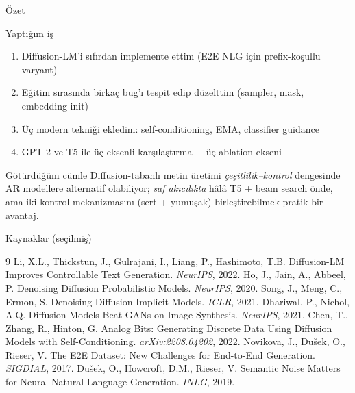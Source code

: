 \documentclass[10pt,aspectratio=169]{beamer}
\begin{document}
\begin{frame}{Özet}
  \begin{block}{Yaptığım iş}
    \begin{enumerate}
      \item Diffusion-LM'i sıfırdan implemente ettim (E2E NLG için
            prefix-koşullu varyant)
      \item Eğitim sırasında birkaç bug'ı tespit edip düzelttim
            (sampler, mask, embedding init)
      \item Üç modern tekniği ekledim: self-conditioning, EMA,
            classifier guidance
      \item GPT-2 ve T5 ile üç eksenli karşılaştırma + üç ablation ekseni
    \end{enumerate}
  \end{block}

  \begin{exampleblock}{Götürdüğüm cümle}
    Diffusion-tabanlı metin üretimi \emph{çeşitlilik--kontrol} dengesinde
    AR modellere alternatif olabiliyor; \emph{saf akıcılıkta} hâlâ
    T5 + beam search önde, ama iki kontrol mekanizmasını
    (sert + yumuşak) birleştirebilmek pratik bir avantaj.
  \end{exampleblock}
\end{frame}

\begin{frame}{Kaynaklar (seçilmiş)}
  \footnotesize
  \begin{thebibliography}{9}
     Li, X.L., Thickstun, J., Gulrajani, I., Liang, P., Hashimoto, T.B.
      \newblock Diffusion-LM Improves Controllable Text Generation. \emph{NeurIPS}, 2022.
     Ho, J., Jain, A., Abbeel, P.
      \newblock Denoising Diffusion Probabilistic Models. \emph{NeurIPS}, 2020.
     Song, J., Meng, C., Ermon, S.
      \newblock Denoising Diffusion Implicit Models. \emph{ICLR}, 2021.
     Dhariwal, P., Nichol, A.Q.
      \newblock Diffusion Models Beat GANs on Image Synthesis. \emph{NeurIPS}, 2021.
     Chen, T., Zhang, R., Hinton, G.
      \newblock Analog Bits: Generating Discrete Data Using Diffusion Models with
      Self-Conditioning. \emph{arXiv:2208.04202}, 2022.
     Novikova, J., Dušek, O., Rieser, V.
      \newblock The E2E Dataset: New Challenges for End-to-End Generation.
      \emph{SIGDIAL}, 2017.
     Dušek, O., Howcroft, D.M., Rieser, V.
      \newblock Semantic Noise Matters for Neural Natural Language Generation.
      \emph{INLG}, 2019.
  \end{thebibliography}
\end{frame}
\end{document}
